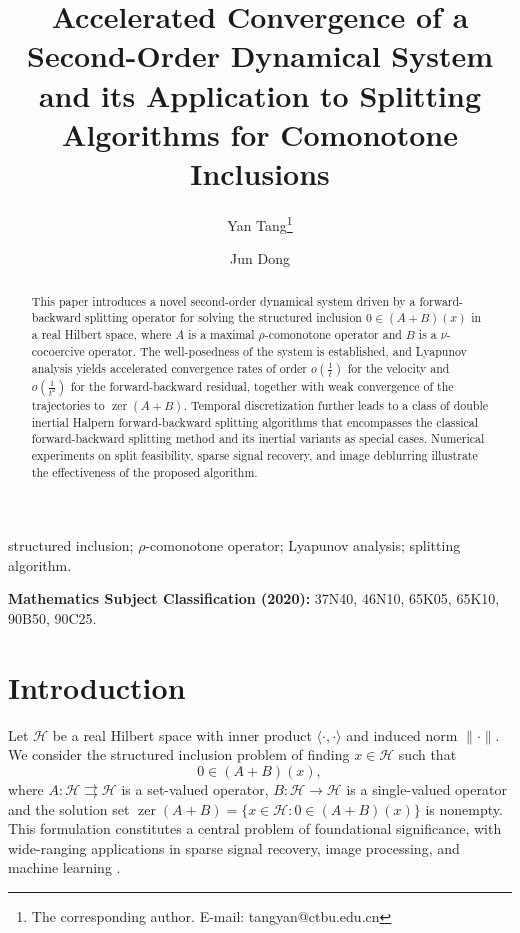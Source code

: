 \documentclass{article}
\title{Accelerated Convergence of a Second-Order Dynamical System and its Application to Splitting Algorithms for Comonotone Inclusions}
\author[1]{Yan Tang\thanks{The corresponding author. E-mail: tangyan@ctbu.edu.cn}}
\author[1]{Jun Dong}
\affil[1]{School of Mathematics and Statistics, Chongqing Technology and Business University, Chongqing 400067, People's Republic of China}
\date{}
\theoremstyle{definition}
\theoremstyle{definition}
\theoremstyle{definition}
\begin{document}
\maketitle

\begin{abstract}
This paper introduces a novel second-order dynamical system driven by a forward-backward splitting operator for solving the structured inclusion $0\in(A+B)(x)$ in a real Hilbert space, where $A$ is a maximal $\rho$-comonotone operator and $B$ is a $\nu$-cocoercive operator. The well-posedness of the system is established, and Lyapunov analysis yields accelerated convergence rates of order $o(\frac{1}{t})$ for the velocity and $o(\frac{1}{t^2})$ for the forward-backward residual, together with weak convergence of the trajectories to $\operatorname{zer}(A+B)$. Temporal discretization further leads to a class of double inertial Halpern forward-backward splitting algorithms that encompasses the classical forward-backward splitting method and its inertial variants as special cases. Numerical experiments on split feasibility, sparse signal recovery, and image deblurring illustrate the effectiveness of the proposed algorithm.
\end{abstract}

\begin{keywords}
structured inclusion; $\rho$-comonotone operator; Lyapunov analysis; splitting algorithm.
\end{keywords}

\noindent \textbf{Mathematics Subject Classification (2020):} 37N40, 46N10, 65K05, 65K10, 90B50, 90C25.

\section{Introduction}
Let $\mathcal{H}$ be a real Hilbert space with inner product $\langle\cdot,\cdot\rangle$ and induced norm $\|\cdot\|$.
We consider the structured inclusion problem of finding $x\in\mathcal{H}$ such that
\begin{equation}\label{eq:intro_inclusion}
0\in(A+B)(x),
\end{equation}
where $A:\mathcal{H}\rightrightarrows\mathcal{H}$ is a set-valued operator, $B:\mathcal{H}\to\mathcal{H}$ is a single-valued operator and the solution set $\operatorname{zer}(A+B) = \{x \in \mathcal{H} : 0 \in (A+B)(x)\}$ is nonempty. This formulation constitutes a central problem of foundational significance, with wide-ranging applications in sparse signal recovery, image processing, and machine learning \cite{Combettes, Duchi, Raguet}.
\end{document}
